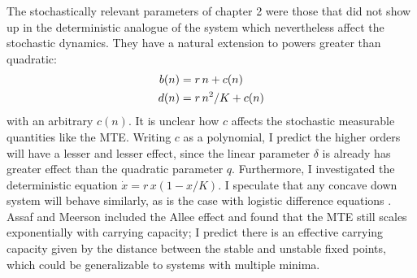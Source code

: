 The stochastically relevant parameters of chapter 2 were those that did not show up in the deterministic analogue of the system which nevertheless affect the stochastic dynamics. 
They have a natural extension to powers greater than quadratic:
\begin{align}
	b(n) &= r\,n + c(n) \\
	d(n) &= r\,n^2/K + c(n) \notag
\end{align}
with an arbitrary $c(n)$. 
It is unclear how $c$ affects the stochastic measurable quantities like the MTE. 
Writing $c$ as a polynomial, I predict the higher orders will have a lesser and lesser effect, since the linear parameter $\delta$ is already has greater effect than the quadratic parameter $q$. 
Furthermore, I investigated the deterministic equation $\dot{x} = r\,x(1-x/K)$. 
I speculate that any concave down system will behave similarly, as is the case with logistic difference equations \cite{Strogatz1994}. 
Assaf and Meerson \cite{Assaf2016} included the Allee effect and found that the MTE still scales exponentially with carrying capacity; I predict there is an effective carrying capacity given by the distance between the stable and unstable fixed points, which could be generalizable to systems with multiple minima. 

